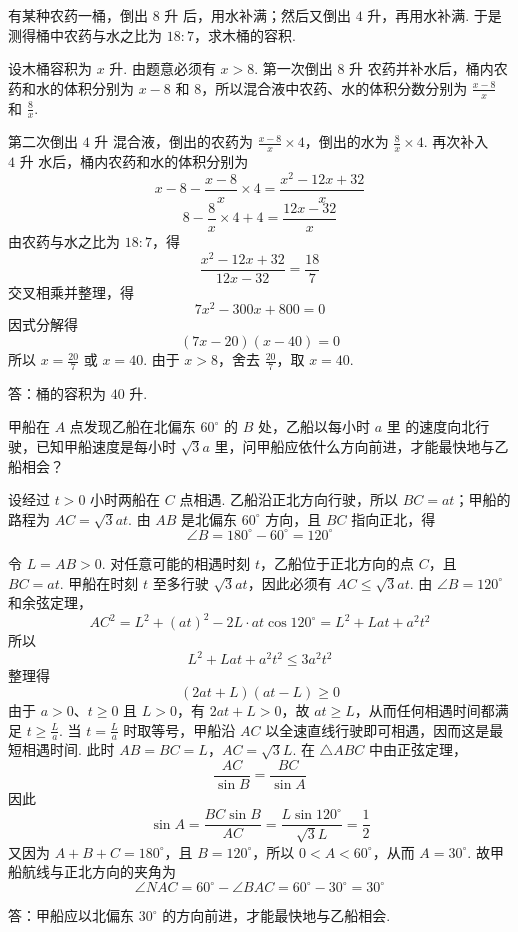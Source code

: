 \begin{problem}
有某种农药一桶，倒出 \(8\text{ 升}\) 后，用水补满；然后又倒出 \(4\text{ 升}\)，再用水补满. 于是测得桶中农药与水之比为 \(18:7\)，求木桶的容积.
\end{problem}

\begin{solution}
设木桶容积为 \(x\text{ 升}\). 由题意必须有 \(x>8\). 第一次倒出 \(8\text{ 升}\) 农药并补水后，桶内农药和水的体积分别为 \(x-8\) 和 \(8\)，所以混合液中农药、水的体积分数分别为 \(\frac{x-8}{x}\) 和 \(\frac{8}{x}\).

第二次倒出 \(4\text{ 升}\) 混合液，倒出的农药为 \(\frac{x-8}{x}\times 4\)，倒出的水为 \(\frac{8}{x}\times 4\). 再次补入 \(4\text{ 升}\) 水后，桶内农药和水的体积分别为
\[
x-8-\frac{x-8}{x}\times 4
=\frac{x^2-12x+32}{x}
\]
\[
8-\frac{8}{x}\times 4+4
=\frac{12x-32}{x}
\]
由农药与水之比为 \(18:7\)，得
\[
\frac{x^2-12x+32}{12x-32}=\frac{18}{7}
\]
交叉相乘并整理，得
\[
7x^2-300x+800=0
\]
因式分解得
\[
\left(7x-20\right)\left(x-40\right)=0
\]
所以 \(x=\frac{20}{7}\) 或 \(x=40\). 由于 \(x>8\)，舍去 \(\frac{20}{7}\)，取 \(x=40\).

答：桶的容积为 \(40\text{ 升}\).
\end{solution}

\begin{problem}
甲船在 \(A\) 点发现乙船在北偏东 \(60^\circ\) 的 \(B\) 处，乙船以每小时 \(a\text{ 里}\) 的速度向北行驶，已知甲船速度是每小时 \(\sqrt{3}a\text{ 里}\)，问甲船应依什么方向前进，才能最快地与乙船相会？
\end{problem}

\begin{solution}
设经过 \(t>0\) 小时两船在 \(C\) 点相遇. 乙船沿正北方向行驶，所以 \(BC=at\)；甲船的路程为 \(AC=\sqrt{3}at\). 由 \(AB\) 是北偏东 \(60^\circ\) 方向，且 \(BC\) 指向正北，得
\[
\angle B=180^\circ-60^\circ=120^\circ
\]


令 \(L=AB>0\). 对任意可能的相遇时刻 \(t\)，乙船位于正北方向的点 \(C\)，且 \(BC=at\). 甲船在时刻 \(t\) 至多行驶 \(\sqrt{3}at\)，因此必须有 \(AC\leq\sqrt{3}at\). 由 \(\angle B=120^\circ\) 和余弦定理，
\[
AC^2=L^2+(at)^2-2L\cdot at\cos120^\circ=L^2+Lat+a^2t^2
\]
所以
\[
L^2+Lat+a^2t^2\leq 3a^2t^2
\]
整理得
\[
(2at+L)(at-L)\geq 0
\]
由于 \(a>0\)、\(t\geq 0\) 且 \(L>0\)，有 \(2at+L>0\)，故 \(at\geq L\)，从而任何相遇时间都满足 \(t\geq \frac{L}{a}\). 当 \(t=\frac{L}{a}\) 时取等号，甲船沿 \(AC\) 以全速直线行驶即可相遇，因而这是最短相遇时间. 此时 \(AB=BC=L\)，\(AC=\sqrt{3}L\). 在 \(\triangle ABC\) 中由正弦定理，
\[
\frac{AC}{\sin B}=\frac{BC}{\sin A}
\]
因此
\[
\sin A=\frac{BC\sin B}{AC}=\frac{L\sin120^\circ}{\sqrt{3}L}=\frac{1}{2}
\]
又因为 \(A+B+C=180^\circ\)，且 \(B=120^\circ\)，所以 \(0<A<60^\circ\)，从而 \(A=30^\circ\). 故甲船航线与正北方向的夹角为
\[
\angle NAC=60^\circ-\angle BAC=60^\circ-30^\circ=30^\circ
\]

答：甲船应以北偏东 \(30^\circ\) 的方向前进，才能最快地与乙船相会.
\end{solution}

